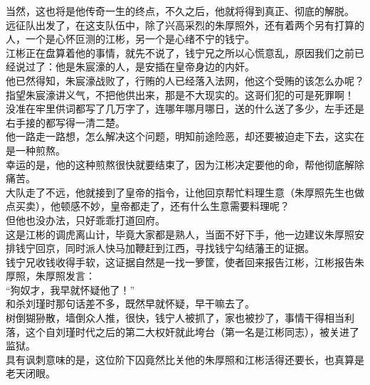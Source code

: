 \begin{multicols}{\theparacolNo}
当然，这也将是他传奇一生的终点，不久之后，他就将得到真正、彻底的解脱。\\

远征队出发了，在这支队伍中，除了兴高采烈的朱厚照外，还有着两个另有打算的人，一个是心怀叵测的江彬，另一个是心绪不宁的钱宁。\\

江彬正在盘算着他的事情，就先不说了，钱宁兄之所以心慌意乱，原因我们之前已经说过了：他是朱宸濠的人，是安插在皇帝身边的内奸。\\

他已然得知，朱宸濠战败了，行贿的人已经落入法网，他这个受贿的该怎么办呢？指望朱宸濠讲义气，不把他供出来，那是不大现实的。这哥们犯的可是死罪啊！\\

没准在牢里供词都写了几万字了，连哪年哪月哪日，送的什么送了多少，左手还是右手接的都写得一清二楚。\\

他一路走一路想，怎么解决这个问题，明知前途险恶，却还要被迫走下去，这实在是一种煎熬。\\

幸运的是，他的这种煎熬很快就要结束了，因为江彬决定要他的命，帮他彻底解除痛苦。\\

大队走了不远，他就接到了皇帝的指令，让他回京帮忙料理生意（朱厚照先生也做点买卖），他顿感不妙，皇帝都走了，还有什么生意需要料理呢？\\

但他也没办法，只好乖乖打道回府。\\

这是江彬的调虎离山计，毕竟大家都是熟人，当面不好下手，他一边建议朱厚照安排钱宁回京，同时派人快马加鞭赶到江西，寻找钱宁勾结藩王的证据。\\

钱宁兄收钱收得手软，这证据自然是一找一箩筐，使者回来报告江彬，江彬报告朱厚照，朱厚照发言：\\

“狗奴才，我早就怀疑他了！”\\

和杀刘瑾时那句话差不多，既然早就怀疑，早干嘛去了。\\

树倒猢狲散，墙倒众人推，很快，钱宁人被抓了，家也被抄了，事情干得相当利落，这个自刘瑾时代之后的第二大权奸就此垮台（第一名是江彬同志），被关进了监狱。\\

具有讽刺意味的是，这位阶下囚竟然比关他的朱厚照和江彬活得还要长，也真算是老天闭眼。\\


\end{multicols}
